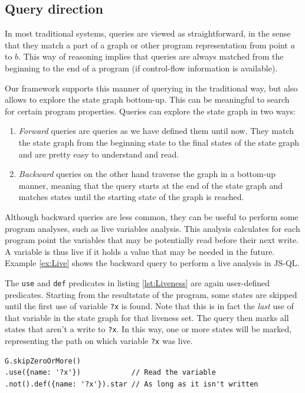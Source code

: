 \subsection{Query direction}

In most traditional systems, queries are viewed as straightforward, in the sense that they match a part of a graph or other program representation from point $a$ to $b$. This way of reasoning implies that queries are always matched from the beginning to the end of a program (if control-flow information is available). 

Our framework supports this manner of querying in the traditional way, but also allows to explore the state graph bottom-up. This can be meaningful to search for certain program properties. Queries can explore the state graph in two ways:
\begin{enumerate}
\item \textit{Forward} queries are queries as we have defined them until now. They match the state graph from the beginning state to the final states of the state graph and are pretty easy to understand and read. 
\item \textit{Backward} queries on the other hand traverse the graph in a bottom-up manner, meaning that the query starts at the end of the state graph and matches states until the starting state of the graph is reached. 
\end{enumerate}

 Although backward queries are less common, they can be useful to perform some program analyses, such as live variables analysis. This analysis calculates for each program point the variables that may be potentially read before their next write. A variable is thus live if it holds a value that may be needed in the future. Example \ref{ex:Live} shows the backward query to perform a live analysis in JS-QL.

 \begin{exmp}
 \label{ex:Live}

 The \texttt{use} and \texttt{def} predicates in listing \ref{lst:Liveness} are again user-defined predicates. Starting from the resultstate of the program, some states are skipped until the first use of variable \texttt{?x} is found. Note that this is in fact the \textit{last} use of that variable in the state graph for that liveness set. The query then marks all states that aren't a write to \texttt{?x}. In this way, one or more states will be marked, representing the path on which variable \texttt{?x} was live.
\begin{lstlisting}[label={lst:Liveness},language=JSQL, caption=Live variables anlysis in JS-QL,mathescape=true]
G.skipZeroOrMore()
.use({name: '?x'})            // Read the variable 
.not().def({name: '?x'}).star // As long as it isn't written
\end{lstlisting}
\end{exmp}

